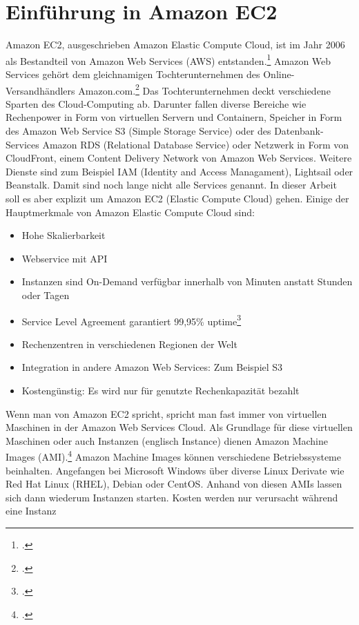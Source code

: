 \documentclass[titlepage]{report}
\begin{document}
\section*{Einführung in Amazon EC2}
Amazon EC2, ausgeschrieben Amazon Elastic Compute Cloud, ist im Jahr
2006 als Bestandteil von Amazon Web Services (AWS)
entstanden.\footcite{aws} Amazon Web Services gehört dem gleichnamigen
Tochterunternehmen des Online\hyp{}Versandhändlers Amazon.com.\footcite{Fou}
Das Tochterunternehmen deckt verschiedene Sparten des Cloud\hyp{}Computing
ab. Darunter fallen diverse Bereiche wie Rechenpower in Form von
virtuellen Servern und Containern, Speicher in Form des Amazon Web
Service S3 (Simple Storage Service) oder des Datenbank\hyp{}Services Amazon
RDS (Relational Database Service) oder Netzwerk in Form von CloudFront,
einem Content Delivery Network von Amazon Web Services. Weitere Dienste
sind zum Beispiel IAM (Identity and Access Managament), Lightsail oder Beanstalk.
Damit sind noch lange nicht alle Services genannt. In dieser Arbeit soll
es aber explizit um Amazon EC2 (Elastic Compute Cloud) gehen. Einige der
Hauptmerkmale von Amazon Elastic Compute Cloud sind:
\begin{itemize}
    \item Hohe Skalierbarkeit
    \item Webservice mit API
    \item Instanzen sind On\hyp{}Demand verfügbar innerhalb von Minuten anstatt
      Stunden oder Tagen
    \item Service Level Agreement garantiert 99,95\% uptime\footcite{ec2}
    \item Rechenzentren in verschiedenen Regionen der Welt
    \item Integration in andere Amazon Web Services: Zum Beispiel S3
    \item Kostengünstig: Es wird nur für genutzte Rechenkapazität bezahlt
\end{itemize}
Wenn man von Amazon EC2 spricht, spricht man fast immer von virtuellen
Maschinen in der Amazon Web Services Cloud. Als Grundlage für diese
virtuellen Maschinen oder auch Instanzen (englisch Instance) dienen
Amazon Machine Images (AMI).\footcite{ec2details} Amazon Machine
Images können verschiedene Betriebssysteme beinhalten. Angefangen bei
Microsoft Windows über diverse Linux Derivate wie Red Hat Linux (RHEL),
Debian oder CentOS. Anhand von diesen AMIs lassen sich dann wiederum
Instanzen starten. Kosten werden nur verursacht während eine Instanz
\end{document}
